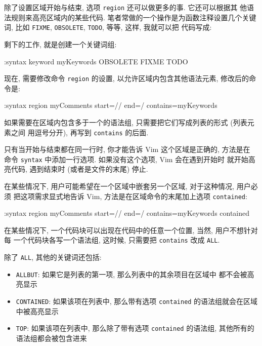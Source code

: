 除了设置区域开始与结束, 选项 \texttt{region} 还可以做更多的事. 它还可以根据其
他语法规则来高亮区域内的某些代码. 笔者常做的一个操作是为函数注释设置几个关键词,
比如 \texttt{FIXME}, \texttt{OBSOLETE}, \texttt{TODO}, 等等, 这样, 我就可以把
代码写成:
\begin{vimcode}
/*  function: splitString()
 *  args    : string
 *  OBSOLETE
 */
function splitString(string) {
...
\end{vimcode}
剩下的工作, 就是创建一个关键词组:
\begin{vimcode}
:syntax keyword myKeywords OBSOLETE FIXME TODO
\end{vimcode}
现在, 需要修改命令 \texttt{region} 的设置, 以允许区域内包含其他语法元素,
修改后的命令是:
\begin{vimcode}
:syntax region myComments start=/\/\*/ end=\/\*\// contains=myKeywords
\end{vimcode}

如果需要在区域内包含多于一个的语法组, 只需要把它们写成列表的形式 (列表元素之间
用逗号分开), 再写到 \texttt{contains} 的后面.

\begin{warning}
    只有当开始与结束都在同一行时, 你才能告诉 Vim 这个区域是正确的, 方法是在
    命令 \texttt{syntax} 中添加一行选项. 如果没有这个选项, Vim 会在遇到开始时
    就开始高亮代码, 遇到结束时 (或者是文件的末尾) 停止.
\end{warning}

在某些情况下, 用户可能希望在一个区域中嵌套另一个区域, 对于这种情况, 用户必须
把这项需求显式地告诉 Vim, 方法是在区域命令的末尾加上选项 \texttt{contained}:
\begin{vimcode}
:syntax region myComments start=/\/\*/ end=\/\*\// contains=myKeywords
contained
\end{vimcode}

在某些情况下, 一个代码块可以出现在代码中的任意一个位置, 当然, 用户不想针对每
一个代码块各写一个语法组, 这时候, 只需要把 \texttt{contains} 改成 \texttt{ALL}.

除了 \texttt{ALL}, 其他的关键词还包括:
\begin{itemize}
    \item \texttt{ALLBUT}: 如果它是列表的第一项, 那么列表中的其余项目在区域中
        都不会被高亮显示
    \item \texttt{CONTAINED}: 如果该项在列表中, 那么带有选项 \texttt{contained}
        的语法组就会在区域中被高亮显示
    \item \texttt{TOP}: 如果该项在列表中, 那么除了带有选项 \texttt{contained}
        的语法组, 其他所有的语法组都会被包含进来
\end{itemize}

